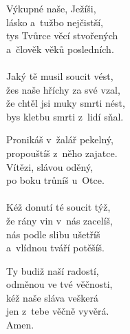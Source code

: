 \begin{translatioMulticol}{3}
Výkupné naše, Ježíši,\\
lásko a~tužbo nejčistší,\\
tys Tvůrce věcí stvořených\\
a~člověk věků posledních.\\
\\
Jaký tě musil soucit vést,\\
žes naše hříchy za své vzal,\\
že chtěl jsi muky smrti nést,\\
bys kletbu smrti z~lidí sňal.\columnbreak

Pronikáš v~žalář pekelný,\\
propouštíš z~něho zajatce.\\
Vítězi, slávou oděný,\\
po boku trůníš u~Otce.\\
\\
Kéž donutí té soucit týž,\\
že rány vin v~nás zacelíš,\\
nás podle slibu ušetříš\\
a~vlídnou tváří potěšíš.\columnbreak

Ty budiž naší radostí,\\
odměnou ve tvé věčnosti,\\
kéž naše sláva veškerá\\
jen z~tebe věčně vyvěrá.\\
Amen.
\end{translatioMulticol}
